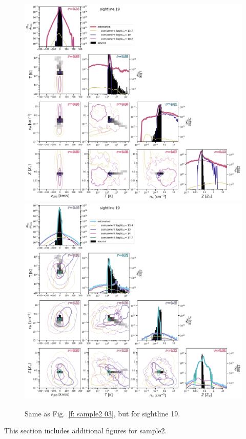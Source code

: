 \documentclass[fleqn,usenatbib]{mnras}
\begin{document}
\begin{figure}
    \centering
    \includegraphics[height=0.45\textheight]{figures/sample2/original/sightline_0019.png}
    \includegraphics[height=0.45\textheight]{figures/sample2/high-z/sightline_0019.png}
    \label{f: sample2 19 corner}
    \caption{Same as Fig.~\ref{f: sample2 03}, but for sightline 19.}
\end{figure}

This section includes additional figures for sample2.



\bsp	%
\label{lastpage}
\end{document}
